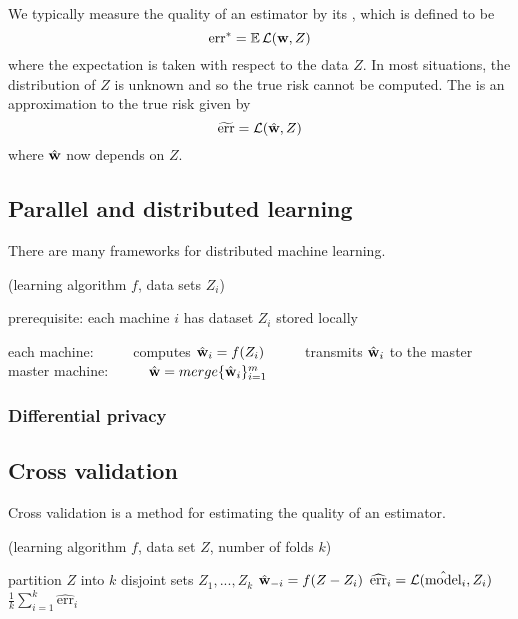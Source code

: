 \documentclass[thesis.tex]{subfiles}
\newcommand{\model}{\hat{\text{model}}}
\newcommand{\riskstar}{{\textrm{err}^*}}
\newcommand{\risktilde}{\widetilde{\textrm{err}}}
\newcommand{\riskhat}{\widehat{\textrm{err}}}
\newcommand{\cv}{\mkprocedure{cv}}
\begin{document}

We typically measure the quality of an estimator by its ,
which is defined to be
\begin{equation}
    \riskstar = \E \Loss(\w,Z)
\end{equation}
where the expectation is taken with respect to the data $Z$.
In most situations, the distribution of $Z$ is unknown and so the true risk cannot be computed.
The  is an approximation to the true risk given by
\begin{equation}
    \risktilde = \Loss(\what,Z)
\end{equation}
where ${\hat{\mathbf w}}$ now depends on $Z$.


\subsection{Parallel and distributed learning}

There are many frameworks for distributed machine learning.

\begin{algorithm}
    \caption{(learning algorithm $f$, data sets $Z_i$)}
    \vspace{0.1in}
    prerequisite: each machine $i$ has dataset $Z_i$ stored locally
    \begin{algorithmic}[1]
        \State each machine:
        \State ~~~~~computes ${\hat{\mathbf w}}_i = f(Z_i)$
        \State ~~~~~transmits ${\hat{\mathbf w}}_i$ to the master
        \State master machine:
        \State ~~~~~${\hat{\mathbf w}} = merge\{{\hat{\mathbf w}}_i\}_{i=1}^m$
    \end{algorithmic}
\end{algorithm}

\subsubsection{Differential privacy}


\subsection{Cross validation}

Cross validation is a method for estimating the quality of an estimator.

\begin{algorithm}
    \caption{\cv(learning algorithm $f$, data set $Z$, number of folds $k$)}
    \vspace{0.1in}
    \begin{algorithmic}[1]
        \State partition $Z$ into $k$ disjoint sets $Z_1,...,Z_k$
        \vspace{0.1in}
            \State ${\hat{\mathbf w}}_{-i} = f(Z - Z_i)$ 
            \State $\riskhat_i = \Loss(\model_i,Z_i)$
        \EndFor
        \vspace{0.1in}
        \State \Return $\frac 1 k \sum_{i=1}^k \riskhat_i$
    \end{algorithmic}
\end{algorithm}
\end{document}
